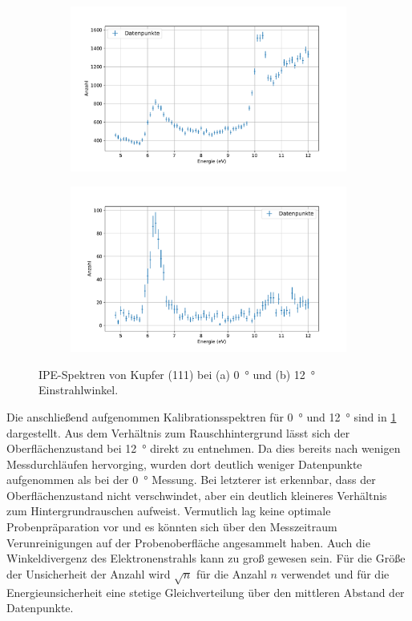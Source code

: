 \begin{figure}[!ht]
    \centering
    \begin{subfigure}{0.495\textwidth}
        \centering
        \includegraphics[width=1.1\textwidth]{plots/Cu_0.pdf}
    \caption{}
    \end{subfigure}
    \begin{subfigure}{0.495\textwidth}
        \centering
        \includegraphics[width=1.1\textwidth]{plots/Cu_12.pdf}
        \caption{}
    \end{subfigure}
    \caption{IPE-Spektren von Kupfer (111) bei (a) \SI{0}{\degree} und (b) \SI{12}{\degree} Einstrahlwinkel.}
    \label{fig_Cu_kal}
\end{figure}
Die anschließend aufgenommen Kalibrationsspektren für \SI{0}{\degree} und \SI{12}{\degree} sind in \cref{fig_Cu_kal} dargestellt.
Aus dem Verhältnis zum Rauschhintergrund lässt sich der Oberflächenzustand bei \SI{12}{\degree} direkt zu entnehmen.
Da dies bereits nach wenigen Messdurchläufen hervorging, wurden dort deutlich weniger Datenpunkte aufgenommen als bei der \SI{0}{\degree} Messung.
Bei letzterer ist erkennbar, dass der Oberflächenzustand nicht verschwindet, aber ein deutlich kleineres Verhältnis zum Hintergrundrauschen aufweist.
Vermutlich lag keine optimale Probenpräparation vor und es könnten sich über den Messzeitraum Verunreinigungen auf der Probenoberfläche angesammelt haben.
Auch die Winkeldivergenz des Elektronenstrahls kann zu groß gewesen sein.
Für die Größe der Unsicherheit der Anzahl wird $\sqrt{n}$ für die Anzahl $n$ verwendet und für die Energieunsicherheit eine stetige Gleichverteilung über den mittleren Abstand der Datenpunkte.

